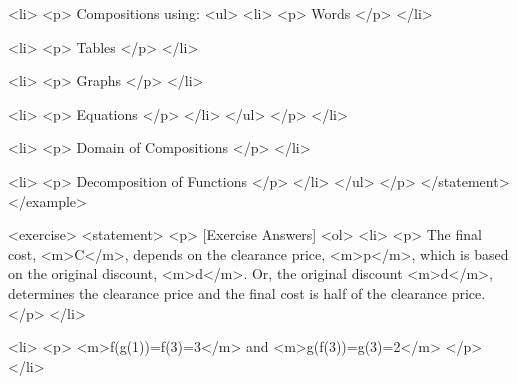                         <li>
                            <p>
                                Compositions using:
                                <ul>
                                    <li>
                                        <p>
                                            Words
                                        </p>
                                    </li>

                                    <li>
                                        <p>
                                            Tables
                                        </p>
                                    </li>

                                    <li>
                                        <p>
                                            Graphs
                                        </p>
                                    </li>

                                    <li>
                                        <p>
                                            Equations
                                        </p>
                                    </li>
                                </ul>
                            </p>
                        </li>

                        <li>
                            <p>
                                Domain of Compositions
                            </p>
                        </li>

                        <li>
                            <p>
                                Decomposition of Functions
                            </p>
                        </li>
                    </ul>
                </p>
            </statement>
        </example>

        <exercise>
            <statement>
                <p>
                    [Exercise Answers]
                    <ol>
                        <li>
                            <p>
                                The final cost, <m>C</m>, depends on the clearance price, <m>p</m>, which is based on the original discount, <m>d</m>.
                                Or, the original discount <m>d</m>, determines the clearance price and the final cost is half of the clearance price.
                            </p>
                        </li>

                        <li>
                            <p>
                                <m>f(g(1))=f(3)=3</m> and <m>g(f(3))=g(3)=2</m>
                            </p>
                        </li>

